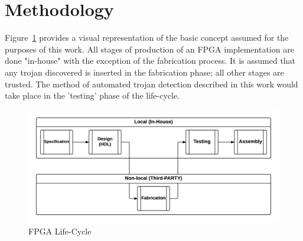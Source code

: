 \label{chapter:trojanDetection}
\section{Methodology}
Figure~\ref{fig:Concept} provides a visual representation of the basic concept assumed for the purposes of this work. 
All stages of production of an \acrshort{FPGA} implementation are done "in-house" with the exception of the fabrication process. 
It is assumed that any trojan discovered is inserted in the fabrication phase; all other stages are trusted.  
The method of automated trojan detection described in this work would take place in the 'testing' phase of the life-cycle. 
\begin{figure}[h]
	\centering
	\includegraphics[width=1\linewidth]{figures/Concept}
	\caption[FPGA Life-Cycle]{FPGA Life-Cycle}
	\label{fig:Concept}
\end{figure}

